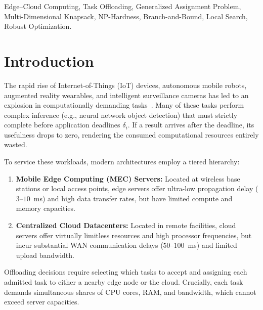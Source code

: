 \documentclass[conference,10pt]{IEEEtran}
\begin{document}
\begin{IEEEkeywords}
Edge--Cloud Computing, Task Offloading, Generalized Assignment Problem, Multi-Dimensional Knapsack, NP-Hardness, Branch-and-Bound, Local Search, Robust Optimization.
\end{IEEEkeywords}

\section{Introduction}
The rapid rise of Internet-of-Things (IoT) devices, autonomous mobile robots, augmented reality wearables, and intelligent surveillance cameras has led to an explosion in computationally demanding tasks~\cite{mach2017mobile}. Many of these tasks perform complex inference (e.g., neural network object detection) that must strictly complete before application deadlines $\delta_i$. If a result arrives after the deadline, its usefulness drops to zero, rendering the consumed computational resources entirely wasted.

To service these workloads, modern architectures employ a tiered hierarchy:
\begin{enumerate}
    \item \textbf{Mobile Edge Computing (MEC) Servers:} Located at wireless base stations or local access points, edge servers offer ultra-low propagation delay ($3$--$10$~ms) and high data transfer rates, but have limited compute and memory capacities.
    \item \textbf{Centralized Cloud Datacenters:} Located in remote facilities, cloud servers offer virtually limitless resources and high processor frequencies, but incur substantial WAN communication delays ($50$--$100$~ms) and limited upload bandwidth.
\end{enumerate}

Offloading decisions require selecting which tasks to accept and assigning each admitted task to either a nearby edge node or the cloud. Crucially, each task demands simultaneous shares of CPU cores, RAM, and bandwidth, which cannot exceed server capacities.
\end{document}

